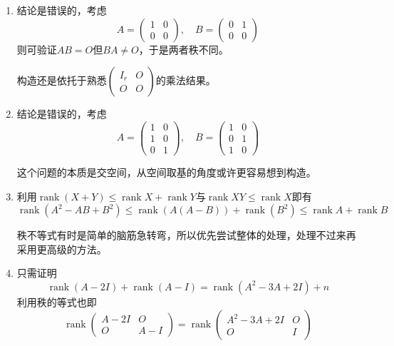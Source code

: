 \documentclass[a4paper,UTF8,fontset=windows]{ctexart}
\DeclareMathOperator{\rank}{rank}
\newcommand*{\note}{\noindent *}
\begin{document}
\begin{enumerate}
\begin{enumerate}[(1)]
        \item 结论是错误的，考虑
        $$A=\begin{pmatrix}1&0\\0&0\end{pmatrix},\quad B=\begin{pmatrix}0&1\\0&0\end{pmatrix}$$
        则可验证$AB=O$但$BA\ne O$，于是两者秩不同。

        \note 构造还是依托于熟悉$\begin{pmatrix}I_r&O\\O&O\end{pmatrix}$的乘法结果。

        \item 结论是错误的，考虑
        $$A=\begin{pmatrix}1&0\\1&0\\0&1\end{pmatrix},\quad B=\begin{pmatrix}1&0\\0&1\\1&0\end{pmatrix}$$

        \note 这个问题的本质是交空间，从空间取基的角度或许更容易想到构造。

        \item 利用$\rank(X+Y)\le\rank X+\rank Y$与$\rank XY\le\rank X$即有
        $$\rank(A^2-AB+B^2)\le\rank(A(A-B))+\rank(B^2)\le\rank A+\rank B$$

        \note 秩不等式有时是简单的脑筋急转弯，所以优先尝试整体的处理，处理不过来再采用更高级的方法。

        \item 只需证明
        $$\rank(A-2I)+\rank(A-I)=\rank(A^2-3A+2I)+n$$
        利用秩的等式也即
        $$\rank\begin{pmatrix}A-2I&O\\O&A-I\end{pmatrix}=\rank\begin{pmatrix}A^2-3A+2I&O\\O&I\end{pmatrix}$$


\end{enumerate}
\end{enumerate}
\end{document}
